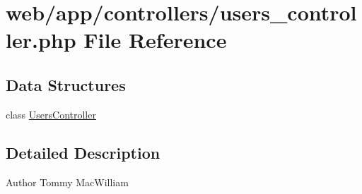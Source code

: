 \hypertarget{users__controller_8php}{
\section{web/app/controllers/users\_\-controller.php File Reference}
\label{users__controller_8php}
}
\subsection*{Data Structures}
\begin{DoxyCompactItemize}
\item 
class \hyperlink{class_users_controller}{UsersController}
\end{DoxyCompactItemize}


\subsection{Detailed Description}
\begin{DoxyAuthor}{Author}
Tommy MacWilliam 
\end{DoxyAuthor}
